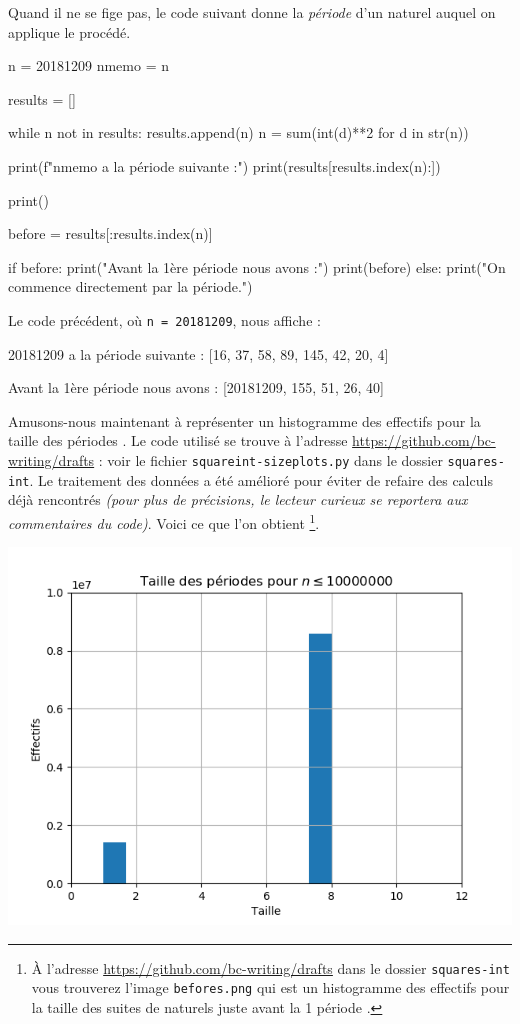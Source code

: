 Quand il ne se fige pas, le code suivant donne la \textit{\og période \fg} d'un naturel auquel on applique le procédé.

\begin{rawcode}
n     = 20181209
nmemo = n

results = []

while n not in results:
    results.append(n)
    n = sum(int(d)**2 for d in str(n))

print(f"{nmemo} a la période suivante :")
print(results[results.index(n):])

print()

before = results[:results.index(n)]

if before:
    print("Avant la 1ère période nous avons :")
    print(before)
else:
    print("On commence directement par la période.")
\end{rawcode}

\medskip

Le code précédent, où \verb+n = 20181209+, nous affiche :

\begin{rawcode}
20181209 a la période suivante :
[16, 37, 58, 89, 145, 42, 20, 4]

Avant la 1ère période nous avons :
[20181209, 155, 51, 26, 40]
\end{rawcode}


\medskip

Amusons-nous maintenant à représenter un histogramme des effectifs pour la taille des \og périodes \fg{}.
Le code utilisé se trouve à l'adresse \url{https://github.com/bc-writing/drafts} : voir le fichier \texttt{squareint-sizeplots.py} dans le dossier \texttt{squares-int}.
Le traitement des données a été amélioré pour éviter de refaire des calculs déjà rencontrés \emph{(pour plus de précisions, le lecteur curieux se reportera aux commentaires du code)}.
Voici ce que l'on obtient
\footnote{
	À l'adresse \url{https://github.com/bc-writing/drafts} dans le dossier \texttt{squares-int} vous trouverez l'image \texttt{befores.png} qui est un histogramme des effectifs pour la taille des suites de naturels juste avant la 1\iere{} \og période \fg{}.
}.

\begin{center}
	\includegraphics[scale=.9]{squares-int/periods.png}
\end{center}


